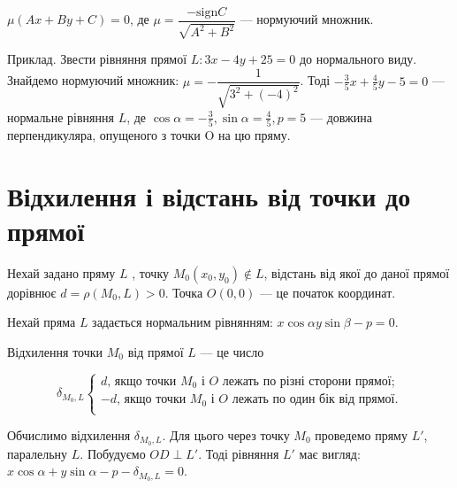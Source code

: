 $\mu(Ax+By+C) = 0$, де $\mu = \dfrac{-\text{sign} C}{\sqrt{A^2 + B^2}}$ --- нормуючий множник.

Приклад. Звести рівняння прямої $L : 3x-4y+25 = 0$ до нормального виду.
Знайдемо нормуючий множник:
$\mu = -\dfrac{1}{\sqrt{3^2 + (-4)^2}}$. Тоді
$-\frac{3}{5}x + \frac{4}{5}y - 5 = 0$ --- нормальне рівняння $L$, де
$\cos\alpha = -\frac{3}{5}, \sin\alpha = \frac{4}{5}, p = 5$ --- довжина перпендикуляра,
опущеного з точки O на цю пряму. 

\section{Відхилення і відстань від точки до прямої}

\parbox{140px}{}
\parbox{7.7cm}{
	Нехай задано пряму $L$ , точку $M_0(x_0,y_0)\not\in L$,
	відстань від якої до даної прямої дорівнює
	$d = \rho(M_0, L) > 0$. Точка $O(0,0)$ --- це
	початок координат.

	Нехай пряма $L$ задається нормальним
	рівнянням: $x\cos\alpha y\sin\beta - p = 0$.
}

\begin{definition}
	Відхилення точки $M_0$ від прямої $L$ --- це число

	$$\delta_{M_0,L}\left\{\begin{array}{l}
		d\text{, якщо точки } M_0 \text{ і } O \text{ лежать по різні сторони прямої;} \\
		-d\text{, якщо точки } M_0 \text{ і } O \text{ лежать по один бік від прямої.} \\
	\end{array}\right.$$
\end{definition}


Обчислимо відхилення $\delta_{M_0,L}$. Для цього через точку $M_0$ проведемо пряму $L'$,
паралельну $L$. Побудуємо $OD \perp L'$. Тоді рівняння $L'$ має вигляд:
$x\cos\alpha + y\sin\alpha - p - \delta_{M_0,L} = 0$.

